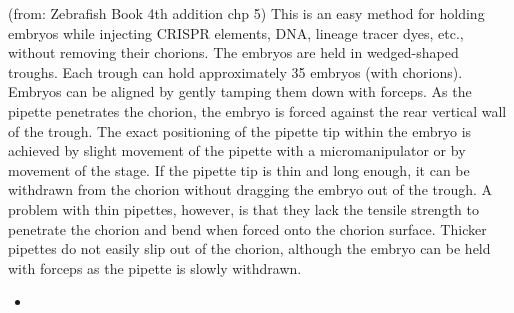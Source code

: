 \documentclass[
  letterpaper,
  DIV=11,
  numbers=noendperiod]{scrreprt}
\providecommand{\tightlist}{%
  \setlength{\itemsep}{0pt}\setlength{\parskip}{0pt}}\usepackage{longtable,booktabs,array}
\begin{document}
\begin{tcolorbox}[enhanced jigsaw, toprule=.15mm, breakable, coltitle=black, leftrule=.75mm, title=\textcolor{quarto-callout-note-color}{\faInfo}\hspace{0.5em}{background}, bottomrule=.15mm, toptitle=1mm, bottomtitle=1mm, colframe=quarto-callout-note-color-frame, opacityback=0, colback=white, opacitybacktitle=0.6, colbacktitle=quarto-callout-note-color!10!white, rightrule=.15mm, titlerule=0mm, arc=.35mm, left=2mm]

(from: Zebrafish Book 4th addition chp 5) This is an easy method for
holding embryos while injecting CRISPR elements, DNA, lineage tracer
dyes, etc., without removing their chorions. The embryos are held in
wedged-shaped troughs. Each trough can hold approximately 35 embryos
(with chorions). Embryos can be aligned by gently tamping them down with
forceps. As the pipette penetrates the chorion, the embryo is forced
against the rear vertical wall of the trough. The exact positioning of
the pipette tip within the embryo is achieved by slight movement of the
pipette with a micromanipulator or by movement of the stage. If the
pipette tip is thin and long enough, it can be withdrawn from the
chorion without dragging the embryo out of the trough. A problem with
thin pipettes, however, is that they lack the tensile strength to
penetrate the chorion and bend when forced onto the chorion surface.
Thicker pipettes do not easily slip out of the chorion, although the
embryo can be held with forceps as the pipette is slowly withdrawn.

\end{tcolorbox}

\begin{itemize}
\tightlist
\item
\end{itemize}
\end{document}
